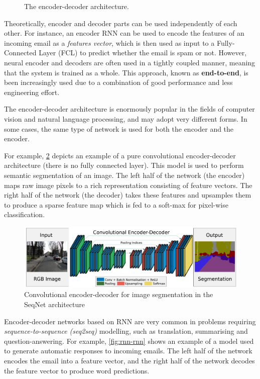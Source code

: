 \begin{figure}[hpt]
	\centering
	
	\caption{The encoder-decoder architecture.}
	\label{fig:encoder-decoder}
\end{figure}

Theoretically, encoder and decoder parts can be used independently of each other. For instance, an encoder RNN can be used to encode the features of an incoming email as a \textit{features vector}, which is then used as input to a Fully-Connected Layer (FCL) to predict whether the email is spam or not. However, neural encoder and decoders are often used in a tightly coupled manner, meaning that the system is trained as a whole. This approach, known as \textbf{end-to-end}, is been increasingly used due to a combination of good performance and less engineering effort.

The encoder-decoder architecture is enormously popular in the fields of computer vision and natural language processing, and may adopt very different forms. In some cases, the same type of network is used for both the encoder and the encoder.

For example, \cref{fig:cnn-cnn} depicts an example of a pure convolutional encoder-decoder architecture (there is no fully connected layer). This model is used to perform semantic segmentation of an image. The left half of the network (the encoder) maps raw image pixels to a rich representation consisting of feature vectors. The right half of the network (the decoder) takes these features and upsamples them to produce a sparse feature map which is fed to a soft-max for pixel-wise classification.

\begin{figure}[hpt]
	\centering
	\includegraphics[scale=0.45]{images/ch3/cnn-cnn.png}
	\caption{Convolutional encoder-decoder for image segmentation in the SeqNet architecture \citep{Badrinarayanan2017}}
	\label{fig:cnn-cnn}
\end{figure}

Encoder-decoder networks based on RNN are very common in problems requiring \textit{sequence-to-sequence (seq2seq)} modelling, such as translation, summarising and question-answering. For example, \cref{fig:rnn-rnn} shows an example of a model used to generate automatic responses to incoming emails. The left half of the network encodes the email into a feature vector, and the right half of the network decodes the feature vector to produce word predictions. 

